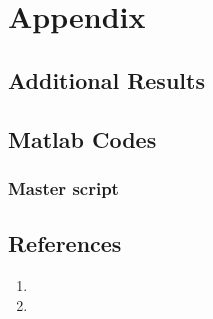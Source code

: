 \graphicspath{{figure_Appendix/}}%

\chapter{Appendix}
\section{Additional Results}
\section{Matlab Codes}
\subsection{Master script}
%
\section{References}
\begin{enumerate}
\item 
\item
\end{enumerate}